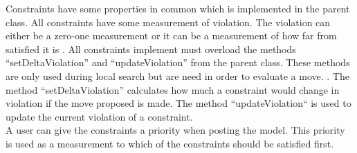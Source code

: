 Constraints have some properties in common which is implemented in the parent class. All constraints have some 
measurement of violation. The violation can either be a zero-one measurement or it can be a measurement of how far 
from satisfied it is . All constraints implement must overload the methods 
``setDeltaViolation'' and ``updateViolation'' from the parent class. These methods are only used during local search but 
are need in order to evaluate a move. . The method ``setDeltaViolation'' calculates how 
much a constraint would change in violation if the move proposed is made. The method ``updateViolation`` is used to 
update the current violation of a constraint. \\
A user can give the constraints a priority when posting the model. This priority is used as a measurement to which of 
the constraints should be satisfied first. \\ 
